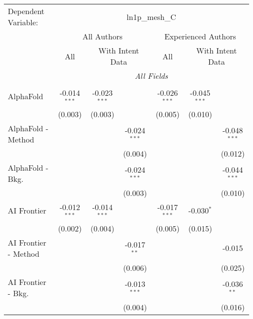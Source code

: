 \begingroup
\centering
\begin{tabular}{lcccccc}
   \tabularnewline \midrule \midrule
   Dependent Variable: & \multicolumn{6}{c}{ln1p\_mesh\_C}\\
 & \multicolumn{3}{c}{All Authors} & \multicolumn{3}{c}{Experienced Authors} \\
\cmidrule(lr){2-4} \cmidrule(lr){5-7}
 & \multicolumn{1}{c}{All} & \multicolumn{2}{c}{With Intent Data} & \multicolumn{1}{c}{All} & \multicolumn{2}{c}{With Intent Data} \\
\cmidrule(lr){2-2} \cmidrule(lr){3-4} \cmidrule(lr){5-5} \cmidrule(lr){6-7}
 & \multicolumn{6}{c}{\textit{All Fields}} \\ \\
   AlphaFold            & -0.014$^{***}$ & -0.023$^{***}$ &                & -0.026$^{***}$ & -0.045$^{***}$ &   \\   
                        & (0.003)        & (0.003)        &                & (0.005)        & (0.010)        &   \\   
   AlphaFold - Method   &                &                & -0.024$^{***}$ &                &                & -0.048$^{***}$\\   
                        &                &                & (0.004)        &                &                & (0.012)\\   
   AlphaFold - Bkg.     &                &                & -0.024$^{***}$ &                &                & -0.044$^{***}$\\   
                        &                &                & (0.003)        &                &                & (0.010)\\   
   AI Frontier          & -0.012$^{***}$ & -0.014$^{***}$ &                & -0.017$^{***}$ & -0.030$^{*}$   &   \\   
                        & (0.002)        & (0.004)        &                & (0.005)        & (0.015)        &   \\   
   AI Frontier - Method &                &                & -0.017$^{**}$  &                &                & -0.015\\   
                        &                &                & (0.006)        &                &                & (0.025)\\   
   AI Frontier - Bkg.   &                &                & -0.013$^{***}$ &                &                & -0.036$^{**}$\\   
                        &                &                & (0.004)        &                &                & (0.016)\\   

\end{tabular}
